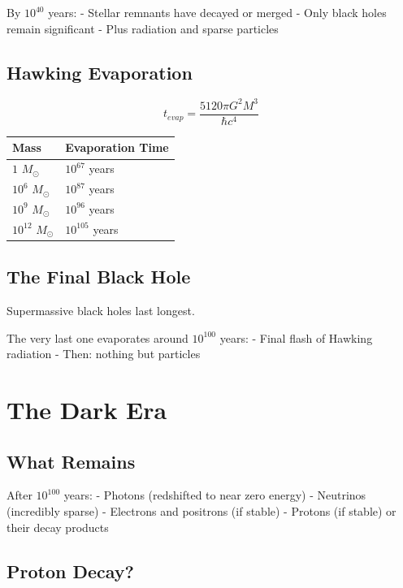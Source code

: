 \documentclass[
  11pt,
  letterpaper,
  twoside,
  openright]{book}
\begin{document}
By \(10^{40}\) years: - Stellar remnants have decayed or merged - Only
black holes remain significant - Plus radiation and sparse particles

\subsection{Hawking Evaporation}\label{hawking-evaporation}

\[
t_{evap} = \frac{5120 \pi G^2 M^3}{\hbar c^4}
\]

\begin{longtable}[]{@{}ll@{}}
\toprule\noalign{}
Mass & Evaporation Time \\
\midrule\noalign{}
\endhead
\bottomrule\noalign{}
\endlastfoot
\(1\) \(M_\odot\) & \(10^{67}\) years \\
\(10^6\) \(M_\odot\) & \(10^{87}\) years \\
\(10^9\) \(M_\odot\) & \(10^{96}\) years \\
\(10^{12}\) \(M_\odot\) & \(10^{105}\) years \\
\end{longtable}

\subsection{The Final Black Hole}\label{the-final-black-hole}

Supermassive black holes last longest.

The very last one evaporates around \(10^{100}\) years: - Final flash of
Hawking radiation - Then: nothing but particles

\section{The Dark Era}\label{the-dark-era}

\subsection{What Remains}\label{what-remains-1}

After \(10^{100}\) years: - Photons (redshifted to near zero energy) -
Neutrinos (incredibly sparse) - Electrons and positrons (if stable) -
Protons (if stable) or their decay products

\subsection{Proton Decay?}\label{proton-decay}
\end{document}

